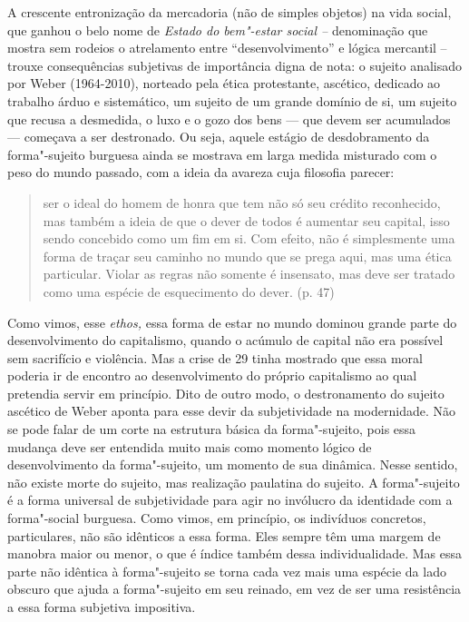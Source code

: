 A crescente entronização da mercadoria (não de simples objetos) na vida
social, que ganhou o belo nome de \emph{Estado do bem"-estar social --}
denominação que mostra sem rodeios o atrelamento entre
``desenvolvimento'' e lógica mercantil -- trouxe consequências
subjetivas de importância digna de nota: o sujeito analisado por Weber
(1964-2010), norteado pela ética protestante, ascético, dedicado ao
trabalho árduo e sistemático, um sujeito de um grande domínio de si, um
sujeito que recusa a desmedida, o luxo e o gozo dos bens --- que devem
ser acumulados --- começava a ser destronado. Ou seja, aquele estágio de
desdobramento da forma"-sujeito burguesa ainda se mostrava em larga
medida misturado com o peso do mundo passado, com a ideia da avareza
cuja filosofia parecer:

\begin{quote}
ser o ideal do homem de honra que tem não só seu crédito reconhecido,
mas também a ideia de que o dever de todos é aumentar seu capital, isso
sendo concebido como um fim em si. Com efeito, não é simplesmente uma
forma de traçar seu caminho no mundo que se prega aqui, mas uma ética
particular. Violar as regras não somente é insensato, mas deve ser
tratado como uma espécie de esquecimento do dever. (p. 47)
\end{quote}

Como vimos, esse \emph{ethos,} essa forma de estar no mundo dominou
grande parte do desenvolvimento do capitalismo, quando o acúmulo de
capital não era possível sem sacrifício e violência. Mas a crise de 29
tinha mostrado que essa moral poderia ir de encontro ao desenvolvimento
do próprio capitalismo ao qual pretendia servir em princípio. Dito de
outro modo, o destronamento do sujeito ascético de Weber aponta para
esse devir da subjetividade na modernidade. Não se pode falar de um
corte na estrutura básica da forma"-sujeito, pois essa mudança deve ser
entendida muito mais como momento lógico de desenvolvimento da
forma"-sujeito, um momento de sua dinâmica. Nesse sentido, não existe
morte do sujeito, mas realização paulatina do sujeito. A forma"-sujeito é
a forma universal de subjetividade para agir no invólucro da identidade
com a forma"-social burguesa. Como vimos, em princípio, os indivíduos
concretos, particulares, não são idênticos a essa forma. Eles sempre têm
uma margem de manobra maior ou menor, o que é índice também dessa
individualidade. Mas essa parte não idêntica à forma"-sujeito se torna
cada vez mais uma espécie da lado obscuro que ajuda a forma"-sujeito em
seu reinado, em vez de ser uma resistência a essa forma subjetiva
impositiva.

